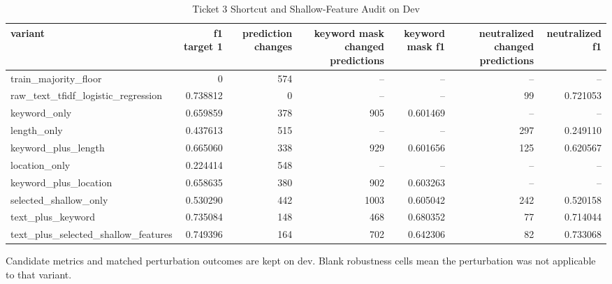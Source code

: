 \begin{table}[t]
\centering
\caption{Ticket 3 Shortcut and Shallow-Feature Audit on Dev}
\label{tab:shortcut_audit}
\begin{adjustbox}{max width=\textwidth}
\scriptsize
\begin{tabular}{lrrrrrr}
\hline
variant & f1 target 1 & prediction changes & keyword mask changed predictions & keyword mask f1 & neutralized changed predictions & neutralized f1 \\
\hline
train\_majority\_floor & 0 & 574 & -- & -- & -- & -- \\
raw\_text\_tfidf\_logistic\_regression & 0.738812 & 0 & -- & -- & 99 & 0.721053 \\
keyword\_only & 0.659859 & 378 & 905 & 0.601469 & -- & -- \\
length\_only & 0.437613 & 515 & -- & -- & 297 & 0.249110 \\
keyword\_plus\_length & 0.665060 & 338 & 929 & 0.601656 & 125 & 0.620567 \\
location\_only & 0.224414 & 548 & -- & -- & -- & -- \\
keyword\_plus\_location & 0.658635 & 380 & 902 & 0.603263 & -- & -- \\
selected\_shallow\_only & 0.530290 & 442 & 1003 & 0.605042 & 242 & 0.520158 \\
text\_plus\_keyword & 0.735084 & 148 & 468 & 0.680352 & 77 & 0.714044 \\
text\_plus\_selected\_shallow\_features & 0.749396 & 164 & 702 & 0.642306 & 82 & 0.733068 \\
\hline
\end{tabular}
\end{adjustbox}
\par\footnotesize{Candidate metrics and matched perturbation outcomes are kept on dev. Blank robustness cells mean the perturbation was not applicable to that variant.}
\end{table}
